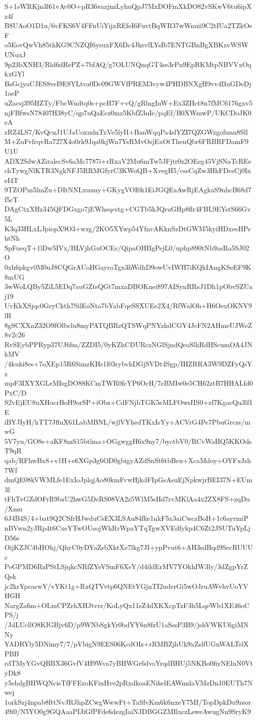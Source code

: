 S+1sWRKjn3l61vAv0O+pR36vazjnzLyhuQpJ7MxDOFmXkDO82vSKwV6tu6ipXz4f
B8UAoO1D1n/6vFKS6V4FFnUiYijxREfeI6FuvtBqWR37wWnuii9C2tIUa2TZkOeF
o5EovQwVh85thKG9CNZQI6ysuxFX6Dc4JksvfLYsIb7ENTGBnBgXBKzvWSWUNuxJ
9p23bXNH3/Rld6dRePZ+7bfAQ/g7OLUNQnqGT4se3rPn9EpRKMtpNBVVxOqkxGYl
BsGcjyaCJES8veI9E8YLtva0Dc09GWVfPREM3vyw4PHDBNXgH9vv4BuGDeDj1aeP
uZacsj395HZTy/FbcWndtq0s+pcH7F+vQ/gRlngInW+Ex3ZHct8n7fMC6176gxv5
njFBfwsN78407H38yC/qp7uQaEcz0mz5KbfZ3uIe/pqEf/B0XWmwP/UKCDoJK0eA
zRZ4LS7/KvQcuJ1UJaUoxudnTxVe5lyII+BanWqqPa4slYZI7QZGWzgofunn8Sll
M+ZuFvfrqvRa727X4o0rk9Jqa0kjWn7YsRMvOsjExOtThenQbr6FRBRFDamF9U1U
ADX2SdwAZiralecSv6aMc7787i+rRxaV2Mu6mTw5JFjtr0z2OEeg45VjSNaTcREe
chTywgNlKTR3NgkNFJ5RRMGfyrC3KWoQB+XvegH5/cssCqZw3HkFDcsCj0IxeI4T
9TZOPm5lmZu+DItNNLxunuy+GKygVOI0k1EiJGQEaAwRjEAgkaS9nhcB68d7f5cT
DAgCtxXHz345QFDGxgo7jEWhsqcstg+CGTb5kJQruGHp8flr4FBL9EYstS66Gv5L
K3q33HLxLJpiopX9O3+wzg/2KO5XYwp54YfnvAKknSzDtGWM5kyiHDxeeHPehtNh
SpFueqT+1lDw5IVx/HLVjhGuOCEs/QipaOHHgPejL0/uphp890tNb9asRa5SJ02O
0xh6pkgv0M0uJ8CQGrAUoHGayroTgx3hWdhD9owUvIWH7iKQkIAngKSeEF9K8mUG
3wWoLQBy5ZiL5EDq7auGZtsQGt7mxaDBOKnei897AISynRRsJ1Dh1pObvSZUaj19
UvKkXSjqc0GryCkth7SilEoNta7bYabFqeSSXUEe2X4/RfWalOh+H6OexOKNV9lR
8gSCXXnZ32O9fOlbclu8myPATQBRzQTSWqPNYzhdCGY4JcFN2AHmeUJWeZ8v2c26
RvSEybPPRyp37UJ6fm/ZZDI5/0yKZhCDURczNGlSjndQeoSlhRdHScumOA4JNkMV
/4kuki8es+7oXEp15R6SimzKHs1l03rybvhDGjSVDt4Sgp/IHZRRA3W9DZFyQsYz
mpF3IXYXGLeMIsgDO88KCmTWR0fcYP6OcH/7cBMIw0e5CH62ztB7HHALfd0PxC/D
S2vEjEU8uXHocrBoH9orSP+iObz+CdFNjbTGK5eMLFOwsIIS0+zf7KgacQu3lf1E
iBYJIyH/hTT7JfluX61LabMBNL/wjlVYhedTKxIsYy+ACVrG4Pe7PbuGrczs/mwG
5V7yn/GO8e+aKF8mS15btlma+OGgwggH6x9ny7/byctbV0/RCvWaHQ5KKOdsT9qR
qab/RFhwBx8+v1H+e6XGp3g6OD0gbigyAZdSnSt6tbBeu+XcaMdoy+OYFxJsh7Wf
dmQE08kVWMLfe1ExIoJplqjAo80kmFvwHjkdFIpGsAsuEjNpkwjrBEI37N+EUm3l
tFhTvGZdOFrR9bzU2hwG5DcRS08VA2z5WlM5sHd7rvMKlAa4x2ZX8FS+zqDu/Xmu
6J4B4S/4+bat9Q2CSfrHJwduCsEX3LSAu84fke1nkF5x3aiCwczBoH+1c6ayrmiP
nBVwn2yJRp4t6CxeYTwOUsojWhRrWpaYTqTgwXVEdfykp4C6Zt2JSUTuYpLjD56s
OijKZJC4bHOhj/QhyC0yDYaZsbXktXe7lkg7JI+ypPvut6+AH3sdBqd9SecRUUUc
PeGPMD6RzPStLSjqkcNRfZYeVSmF6XsY/d4ildErMV7YOkhIW3ly/3dZgpYrZQsk
jc2krYpcaswY/vYKt1g+RxQTVvtp6QNEtYGjnTI2uderGi5wOJruAWvhvUoYVHGH
NargZa6m+OLmCPZrhXHJtvrs/KoLyQx11sZ4dXKXcpTzF3h5LqeWb1XE46oCPS/j
/JdLUcllO8KIGBjv6D/p9WNbSgkYr0bdYY6n8fzU1aSssP3B9/jshVWKU6giMNNy
YADRYly5DNimy7/7/pVbigN9EES06KcdOIz+rRMBZjhUk9xZslfUGnWALTslXPBB
rdTMyYGvQBBX36GvfV4H9Wva7yBHWGr6dvaYrqdBHUj5NKBo0fiyNElnN0VtyDk8
y5ehdgBHWQNcisTfFFEzoKFinHve2pRxdkoaENikelEAWmdaVMzDn10EUTh7Nwej
1orkSzj4npab8fttNvJRJhpZCwgWwwFt+TaSfvKm6k6nxeY7MI/TopDpkDu9zsor
49i0/N5YO0g9GQAaaPIJiGfPFde6dezgIaiNJDBGGZMIlxczLsweAwugNn9SryK9
